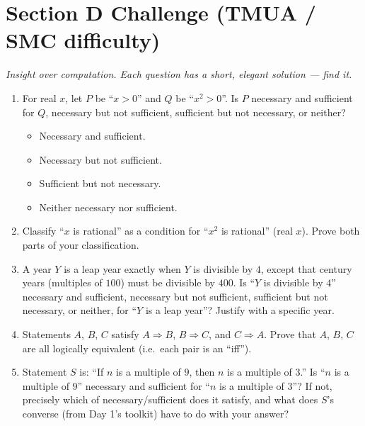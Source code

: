 \documentclass[11pt,a4paper]{article}
\begin{document}
\section*{Section D \quad Challenge \hfill{\normalfont\small(TMUA / SMC difficulty)}}

\noindent\textit{Insight over computation. Each question has a short, elegant solution --- find it.}

\begin{enumerate}

\item For real $x$, let $P$ be ``$x>0$'' and $Q$ be ``$x^2>0$''. Is $P$ necessary and sufficient for $Q$, necessary but not sufficient, sufficient but not necessary, or neither?
\begin{itemize}
\item[A)] Necessary and sufficient.
\item[B)] Necessary but not sufficient.
\item[C)] Sufficient but not necessary.
\item[D)] Neither necessary nor sufficient.
\end{itemize}

\item Classify ``$x$ is rational'' as a condition for ``$x^2$ is rational'' (real $x$). Prove both parts of your classification.

\item A year $Y$ is a leap year exactly when $Y$ is divisible by $4$, except that century years (multiples of $100$) must be divisible by $400$. Is ``$Y$ is divisible by $4$'' necessary and sufficient, necessary but not sufficient, sufficient but not necessary, or neither, for ``$Y$ is a leap year''? Justify with a specific year.

\item Statements $A$, $B$, $C$ satisfy $A \Rightarrow B$, $B \Rightarrow C$, and $C \Rightarrow A$. Prove that $A$, $B$, $C$ are all logically equivalent (i.e.\ each pair is an ``iff'').

\item Statement $S$ is: ``If $n$ is a multiple of $9$, then $n$ is a multiple of $3$.'' Is ``$n$ is a multiple of $9$'' necessary and sufficient for ``$n$ is a multiple of $3$''? If not, precisely which of necessary/sufficient does it satisfy, and what does $S$'s converse (from Day 1's toolkit) have to do with your answer?

\end{enumerate}

\end{document}
